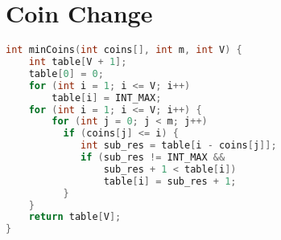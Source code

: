 \newpage

\section{Coin Change}
\begin{lstlisting}[language = C++, title={Versão 1}]
int minCoins(int coins[], int m, int V) {
    int table[V + 1];
    table[0] = 0;
    for (int i = 1; i <= V; i++)
        table[i] = INT_MAX;
    for (int i = 1; i <= V; i++) {
        for (int j = 0; j < m; j++)
          if (coins[j] <= i) {
             int sub_res = table[i - coins[j]];
             if (sub_res != INT_MAX && 
             	 sub_res + 1 < table[i])
                 table[i] = sub_res + 1;
          }
    }
    return table[V];
}
\end{lstlisting}

\newpage

